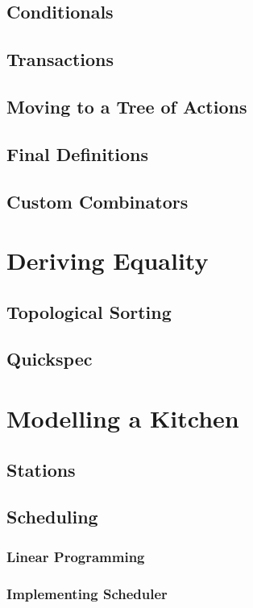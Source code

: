 \documentclass[11pt]{article}
\begin{document}
        \subsection{Conditionals}
        \subsection{Transactions}
        \subsection{Moving to a Tree of Actions}
        \subsection{Final Definitions}
        \subsection{Custom Combinators}

    \section{Deriving Equality}
        \subsection{Topological Sorting}
        \subsection{Quickspec}
    
    \section{Modelling a Kitchen}
        \subsection{Stations}
        \subsection{Scheduling}
            \subsubsection{Linear Programming}
            \subsubsection{Implementing Scheduler}
        
\end{document}
